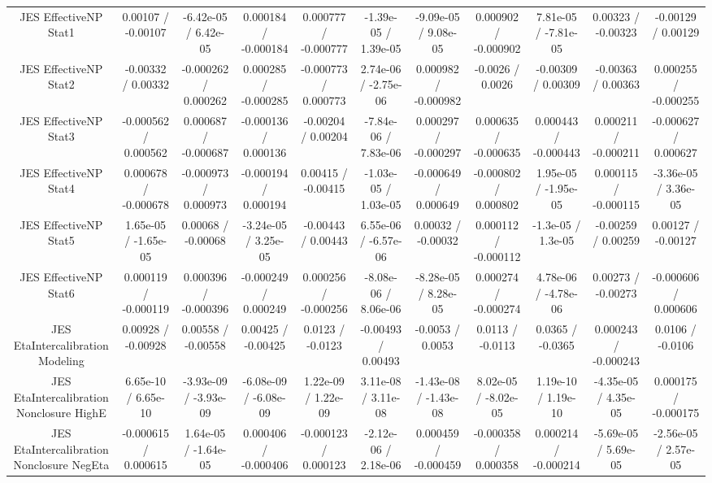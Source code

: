 \begin{table}[htbp]
\begin{center}
\begin{tabular}{|c|c|c|c|c|c|c|c|c|c|c|}
  JES EffectiveNP Stat1 & 0.00107 / -0.00107 & -6.42e-05 / 6.42e-05 & 0.000184 / -0.000184 & 0.000777 / -0.000777 & -1.39e-05 / 1.39e-05 & -9.09e-05 / 9.08e-05 & 0.000902 / -0.000902 & 7.81e-05 / -7.81e-05 & 0.00323 / -0.00323 & -0.00129 / 0.00129 \\ 
  JES EffectiveNP Stat2 & -0.00332 / 0.00332 & -0.000262 / 0.000262 & 0.000285 / -0.000285 & -0.000773 / 0.000773 & 2.74e-06 / -2.75e-06 & 0.000982 / -0.000982 & -0.0026 / 0.0026 & -0.00309 / 0.00309 & -0.00363 / 0.00363 & 0.000255 / -0.000255 \\ 
  JES EffectiveNP Stat3 & -0.000562 / 0.000562 & 0.000687 / -0.000687 & -0.000136 / 0.000136 & -0.00204 / 0.00204 & -7.84e-06 / 7.83e-06 & 0.000297 / -0.000297 & 0.000635 / -0.000635 & 0.000443 / -0.000443 & 0.000211 / -0.000211 & -0.000627 / 0.000627 \\ 
  JES EffectiveNP Stat4 & 0.000678 / -0.000678 & -0.000973 / 0.000973 & -0.000194 / 0.000194 & 0.00415 / -0.00415 & -1.03e-05 / 1.03e-05 & -0.000649 / 0.000649 & -0.000802 / 0.000802 & 1.95e-05 / -1.95e-05 & 0.000115 / -0.000115 & -3.36e-05 / 3.36e-05 \\ 
  JES EffectiveNP Stat5 & 1.65e-05 / -1.65e-05 & 0.00068 / -0.00068 & -3.24e-05 / 3.25e-05 & -0.00443 / 0.00443 & 6.55e-06 / -6.57e-06 & 0.00032 / -0.00032 & 0.000112 / -0.000112 & -1.3e-05 / 1.3e-05 & -0.00259 / 0.00259 & 0.00127 / -0.00127 \\ 
  JES EffectiveNP Stat6 & 0.000119 / -0.000119 & 0.000396 / -0.000396 & -0.000249 / 0.000249 & 0.000256 / -0.000256 & -8.08e-06 / 8.06e-06 & -8.28e-05 / 8.28e-05 & 0.000274 / -0.000274 & 4.78e-06 / -4.78e-06 & 0.00273 / -0.00273 & -0.000606 / 0.000606 \\ 
  JES EtaIntercalibration Modeling & 0.00928 / -0.00928 & 0.00558 / -0.00558 & 0.00425 / -0.00425 & 0.0123 / -0.0123 & -0.00493 / 0.00493 & -0.0053 / 0.0053 & 0.0113 / -0.0113 & 0.0365 / -0.0365 & 0.000243 / -0.000243 & 0.0106 / -0.0106 \\ 
  JES EtaIntercalibration Nonclosure HighE & 6.65e-10 / 6.65e-10 & -3.93e-09 / -3.93e-09 & -6.08e-09 / -6.08e-09 & 1.22e-09 / 1.22e-09 & 3.11e-08 / 3.11e-08 & -1.43e-08 / -1.43e-08 & 8.02e-05 / -8.02e-05 & 1.19e-10 / 1.19e-10 & -4.35e-05 / 4.35e-05 & 0.000175 / -0.000175 \\ 
  JES EtaIntercalibration Nonclosure NegEta & -0.000615 / 0.000615 & 1.64e-05 / -1.64e-05 & 0.000406 / -0.000406 & -0.000123 / 0.000123 & -2.12e-06 / 2.18e-06 & 0.000459 / -0.000459 & -0.000358 / 0.000358 & 0.000214 / -0.000214 & -5.69e-05 / 5.69e-05 & -2.56e-05 / 2.57e-05 \\ 

\end{tabular}
\end{center}
\end{table}
